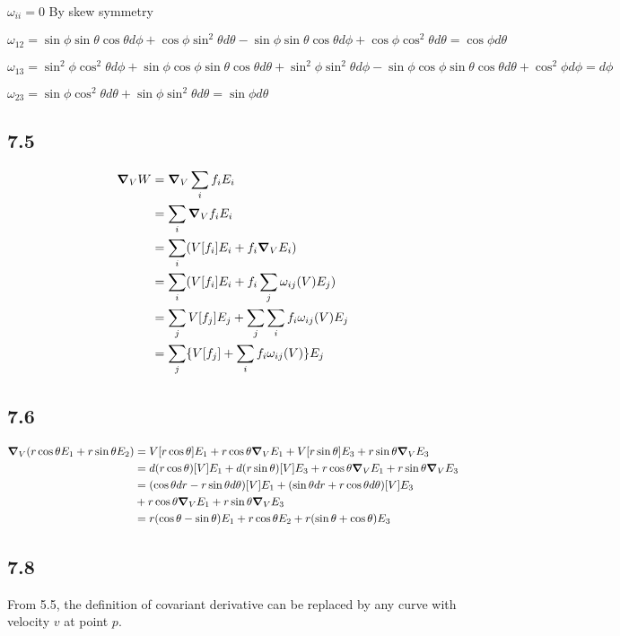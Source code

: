 \documentclass[12pt]{article}
\begin{document}
$
\omega_{ii} =0
$ By skew symmetry 


$\omega_{12} = \sin\phi \sin\theta\cos\theta d\phi + \cos\phi\sin^2\theta d\theta - \sin\phi \sin\theta\cos\theta d\phi + \cos\phi\cos^2\theta d\theta = \cos\phi d\theta 
$

$
\omega_{13} = \sin^2\phi \cos^2\theta d\phi + \sin\phi\cos\phi\sin\theta\cos\theta d\theta +\sin^2\phi \sin^2\theta d\phi - \sin\phi\cos\phi\sin\theta\cos\theta d\theta + \cos^2\phi d\phi = d\phi
$

$
 \omega_{23} = \sin\phi \cos^2\theta d\theta + \sin\phi\sin^2\theta d\theta = \sin\phi d\theta
$

\subsection*{7.5}
$$\begin{aligned}
	\grad_V W &= \grad_V \sum_i f_i E_i \\
	&= \sum_i \grad_V f_i E_i \\
	&= \sum_i ( V[f_i]E_i + f_i \grad_V E_i ) \\
	&= \sum_i ( V[f_i]E_i + f_i  \sum_j \omega_{ij}(V) E_j ) \\
	&= \sum_j V[f_j]E_j +  \sum_j \sum_i f_i \omega_{ij}(V) E_j  \\
	&= \sum_j \{V[f_j] + \sum_i f_i \omega_{ij}(V) \}  E_j
\end{aligned}
$$

\subsection*{7.6}
 $$\begin{aligned}
 	\grad_V(r\cos\theta E_1 + r\sin\theta E_2) &= V[r\cos\theta]E_1 + r\cos\theta \grad_V E_1 + V[r\sin\theta]E_3 + r \sin\theta \grad_V E_3 \\ &= d(r\cos\theta)[V]E_1 + d(r\sin\theta)[V]E_3  + r\cos\theta \grad_V E_1 + r \sin\theta \grad_V E_3 \\&= (\cos\theta dr - r\sin\theta d\theta)[V]E_1 + (\sin\theta dr + r\cos\theta d\theta)[V]E_3  \\ &+ r\cos\theta \grad_V E_1 + r \sin\theta \grad_V E_3 \\
 	&= r(\cos\theta - \sin\theta)E_1 + r\cos\theta E_2 + r(\sin\theta  + \cos\theta)E_3 
 \end{aligned}$$

\subsection*{7.8}
From 5.5, the definition of covariant derivative can be replaced by any curve with velocity $v$ at point $p$.
\end{document}
